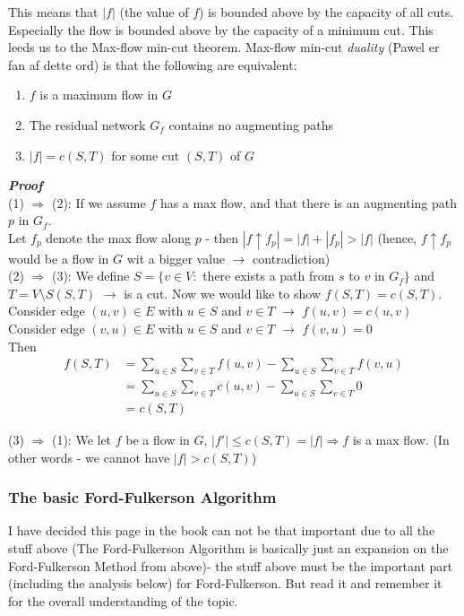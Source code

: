 \documentclass[12pt]{article}
\begin{document}
This means that $|f|$ (the value of $f$) is bounded above by the capacity of all cuts. Especially the flow is bounded above by the capacity of a minimum cut. This leeds us to the Max-flow min-cut theorem. Max-flow min-cut \textit{duality} (Pawel er fan af dette ord) is that the following are equivalent:

\begin{enumerate}
	\item $f$ is a maximum flow in $G$
	\item The residual network $G_f$ contains no augmenting paths 
	\item $|f| = c(S, T)$ for some cut $(S, T)$ of $G$
\end{enumerate}

\textbf{\textit{Proof}}\\
(1) $\Rightarrow$ (2): If we assume $f$ has a max flow, and that there is an augmenting path $p$ in $G_f$. \\
Let $f_p$ denote the max flow along $p$ - then $|f \uparrow f_p| = |f| + |f_p| > |f|$ (hence, $f \uparrow f_p$ would be a flow in $G$ wit a bigger value $\rightarrow$ contradiction)\\

(2) $\Rightarrow$ (3): We define $S = \{v \in V :$ there exists a path from $s$ to $v$ in $G_f\}$ and $T = V\setminus S (S, T)$ $\rightarrow$ is a cut. Now we would like to show $f(S, T) = c(S, T)$. \\

Consider edge $(u, v) \in E$ with $u\in S$ and $v \in T$ $\rightarrow$ $f(u, v) = c(u, v)$\\
Consider edge $(v, u) \in E$ with $u\in S$ and $v \in T$ $\rightarrow$ $f(v, u) = 0$\\

Then \begin{align*}
f(S, T) &= \sum_{u \in S} \sum_{v \in T} f(u, v) - \sum_{u \in S} \sum_{v \in T} f(v, u)\\
&= \sum_{u \in S} \sum_{v \in T} c(u, v) - \sum_{u \in S} \sum_{v \in T} 0\\
&= c(S, T)
\end{align*}

(3) $\Rightarrow$ (1): We let $f$ be a flow in $G$, $|f'| \leq c(S, T) = |f| \Rightarrow f$ is a max flow. (In other words - we cannot have $|f| > c(S, T)$)
%
\subsubsection{The basic Ford-Fulkerson Algorithm}
I have decided this page in the book can not be that important due to all the stuff above (The Ford-Fulkerson Algorithm is basically just an expansion on the Ford-Fulkerson Method from above)- the stuff above must be the important part (including the analysis below) for Ford-Fulkerson. But read it and remember it for the overall understanding of the topic. 
%
\end{document}
